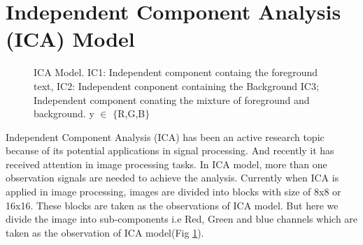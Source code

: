 

\section{Independent Component Analysis (ICA) Model}
\label{sec:format}
 

\begin{figure}[t]
\centering
{}
\caption
{ICA Model. IC1: Independent component containg the foreground text, IC2: Independent
conponent containing the Background IC3; Independent component conating the mixture of foreground and background.
y $\in$ $\{$R,G,B$\}$}
\label{fig:frame}
\end{figure}
Independent Component Analysis (ICA) has been an active research topic 
because of its potential applications in signal processing. And recently 
it has received attention in image processing tasks.
In ICA model, more than one observation signals are needed to achieve the 
analysis.
Currently when ICA is applied in image processing, images are divided into blocks \cite{chap4-1,chap4-2,chap4-3}  
with size of 8x8 or 16x16. These blocks are taken as the observations of ICA model.
But here we divide the image into sub-components i.e Red, Green and blue channels which are
taken as the observation of ICA model(Fig \ref{fig:frame}). 

